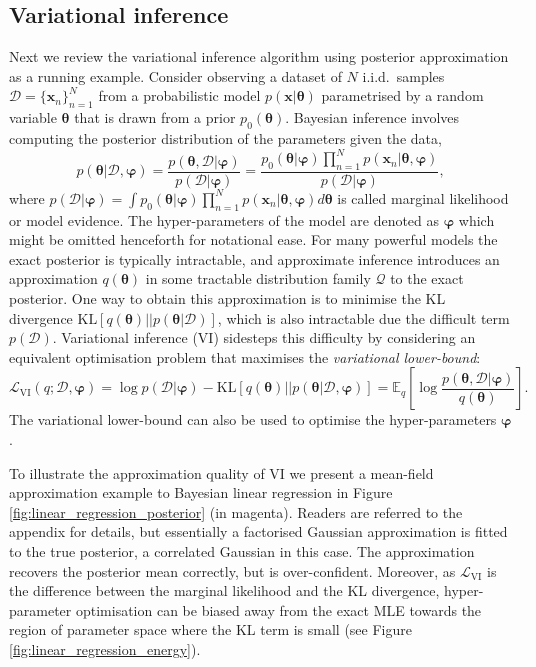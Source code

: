 \subsection{Variational inference}
\label{sec:vi}
Next we review the variational inference algorithm \cite{jordan:vi, beal:thesis} using posterior approximation as a running example.
%
Consider observing a dataset of $N$ i.i.d.~samples $\mathcal{D} = \{\bm{x}_n \}_{n=1}^N$ from a probabilistic model $p(\bm{x}|\bm{\theta})$ parametrised by a random variable $\bm{\theta}$ that is drawn from a prior $p_0(\bm{\theta})$. Bayesian inference involves computing the posterior distribution of the parameters given the data, 
\begin{equation}
p(\bm{\theta} | \mathcal{D}, \bm{\varphi}) = \frac{p(\bm{\theta}, \mathcal{D}| \bm{\varphi})}{p(\mathcal{D}| \bm{\varphi})} = \frac{p_0(\bm{\theta}| \bm{\varphi}) \prod_{n=1}^{N} p(\bm{x}_n | \bm{\theta}, \bm{\varphi})}{p(\mathcal{D}| \bm{\varphi})}, 
\end{equation}
where $p(\mathcal{D}| \bm{\varphi}) = \int p_0(\bm{\theta}| \bm{\varphi}) \prod_{n=1}^{N} p(\bm{x}_n | \bm{\theta}, \bm{\varphi}) d\bm{\theta}$ is called marginal likelihood or model evidence. The hyper-parameters of the model are denoted as $\bm{\varphi}$ which might be omitted henceforth for notational ease. 
%
For many powerful models the exact posterior is typically intractable, and approximate inference introduces an approximation $q(\bm{\theta})$ in some tractable distribution family $\mathcal{Q}$ to the exact posterior. One way to obtain this approximation is to minimise the KL divergence $\mathrm{KL}[q(\bm{\theta}) || p(\bm{\theta} | \mathcal{D})]$, which is also intractable due the difficult term $p(\mathcal{D})$. Variational inference (VI) sidesteps this difficulty by considering an equivalent optimisation problem that maximises the \emph{variational lower-bound}:
\begin{equation}
\mathcal{L}_{\text{VI}}(q; \mathcal{D}, \bm{\varphi}) = \log p(\mathcal{D}|\bm{\varphi}) - \mathrm{KL}[q(\bm{\theta}) || p(\bm{\theta} | \mathcal{D}, \bm{\varphi})]
	= \mathbb{E}_{q} \left[ \log  \frac{p(\bm{\theta}, \mathcal{D}|\bm{\varphi})}{q(\bm{\theta})} \right].
\label{eq:vi_bound}
\end{equation}
The variational lower-bound can also be used to optimise the hyper-parameters $\bm{\varphi}$.

%
To illustrate the approximation quality of VI we present a mean-field approximation example to Bayesian linear regression in Figure \ref{fig:linear_regression_posterior} (in magenta). Readers are referred to the appendix for details, but essentially a factorised Gaussian approximation is fitted to the true posterior, a correlated Gaussian in this case. The approximation recovers the posterior mean correctly, but is over-confident. Moreover, as $\mathcal{L}_{\text{VI}}$ is the difference between the marginal likelihood and the KL divergence, hyper-parameter optimisation can be biased away from the exact MLE towards the region of parameter space where the KL term is small \cite{turner:two_problems} (see Figure \ref{fig:linear_regression_energy}). 

